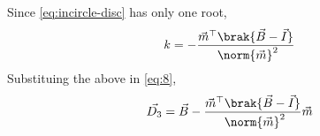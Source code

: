 \solution
Since
	\eqref{eq:incircle-disc}
	has only one root, 
\begin{align}
k=-\frac{\vec{m}^{\top}\brak{\vec{B}-\vec{I}}}{{\ \norm{\vec{m}}^2}}
\end{align}
Substituing the above in 
\eqref{eq:8},
\begin{align}
	\vec{D_{3}} = \vec{B} -\frac{\vec{m}^{\top}\brak{\vec{B}-\vec{I}}}{{\ \norm{\vec{m}}^2}} \vec{m}
\end{align}

